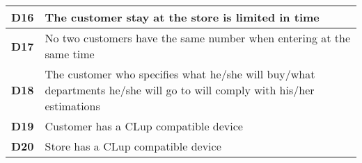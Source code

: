 \begin{center}
{\begin{tabular}{L{2cm}L{12cm}}
            \hline
            \textbf{D16} & The customer stay at the store is limited in time \\
            \hline
            \textbf{D17} & No two customers have the same number when entering at the same time \\
            \hline
            \textbf{D18} & The customer who specifies what he/she will buy/what departments he/she will go to will comply with his/her estimations \\
            \hline
            \textbf{D19} & Customer has a CLup compatible device \\
            \hline
            \textbf{D20} & Store has a CLup compatible device \\
            \hline
        \end{tabular}}
    \end{center}